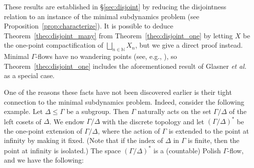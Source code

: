 \documentclass[11pt,reqno,psamsfonts]{amsart}
\theoremstyle{bfnote}
\theoremstyle{definition}
\theoremstyle{remark}
\newcommand{\0}{\varnothing}
\renewcommand{\leq}{\leqslant}
\newcommand{\defeq}{\coloneqq}
\newcommand{\G}{\Gamma}
\newcommand{\N}{\mathbb{N}}
\numberwithin{equation}{section}
\begin{document}
    These results are established in \S\ref{sec:disjoint} by reducing the disjointness relation to an instance of the minimal subdynamics problem (see Proposition~\ref{prop:characterize}). %
    It is possible to deduce Theorem~\ref{theo:disjoint_many} from Theorem~\ref{theo:disjoint_one} by letting $X$ be the one-point compactification of %
    $\bigsqcup_{n \in \N} X_n$, but we give a direct proof instead. Minimal $\G$-flows have no wandering points (see, e.g., \cite[Lem.~2.1]{LLLDyn3}), so Theorem~\ref{theo:disjoint_one} includes the aforementioned result \cite[Thm.~1.2(i)]{BernoulliDisjointness} of Glasner \emph{et al.} as a special case.  %
    
    
    One of the reasons these facts have not been discovered earlier is their %
    tight connection to the minimal subdynamics problem. %
    Indeed, consider the following example. %
    Let $\Delta \leq \G$ be a subgroup. Then $\G$ naturally acts on the set $\G/\Delta$ of the left cosets of $\Delta$. We endow $\G/\Delta$ with the discrete topology and let $(\G/\Delta)^*$ be the one-point extension of $\G/\Delta$, where the action of $\G$ is extended to the point at infinity by making it fixed. (Note that if the index of $\Delta$ in $\G$ is finite, then the point at infinity is isolated.) %
    The space $(\G/\Delta)^*$ is a (countable) Polish $\G$-flow, and we have the following:
\end{document}

